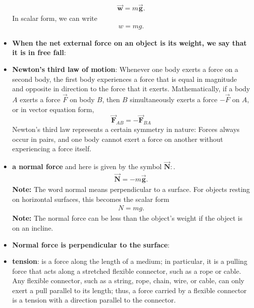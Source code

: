 \documentclass{report}
\begin{document}
\begin{itemize}
\begin{align*}
                    \vec{\mathbf{w}} = m\vec{\mathbf{g}}
                .\end{align*}
                In scalar form, we can write
                \begin{align*}
                    w = mg
                .\end{align*}
            \item \textbf{When the net external force on an object is its weight, we say that it is in free fall}:
            \item \textbf{Newton's third law of motion}:
                Whenever one body exerts a force on a second body, the first body experiences a force that is equal in magnitude and opposite in direction to the force that it exerts. Mathematically, if a body $A$ exerts a force $\vec{F}$ on body $B$, then $B$ simultaneously exerts a force $-\vec{F}$ on $A$, or in vector equation form,
                \[
                    \vec{\mathbf{F}}_{AB} = -\vec{\mathbf{F}}_{BA}
                \]
                \bigbreak \noindent 
                Newton’s third law represents a certain symmetry in nature: Forces always occur in pairs, and one body cannot exert a force on another without experiencing a force itself.
            \item \textbf{a normal force} and here is given by the symbol $\vec{\mathbf{N}}:$.
                \begin{align*}
                    \vec{\mathbf{N}} = -m\vec{\mathbf{g}}
                .\end{align*}
                \textbf{Note:} The word normal means perpendicular to a surface.
                \bigbreak \noindent 
                For objects resting on horizontal surfaces, this becomes the scalar form 
                \begin{align*}
                    N = mg
                .\end{align*}
                \bigbreak \noindent 
                \textbf{Note:} The normal force can be less than the object’s weight if the object is on an incline.
            \item \textbf{Normal force is perpendicular to the surface}:
            \item \textbf{tension}: is a force along the length of a medium; in particular, it is a pulling force that acts along a stretched flexible connector, such as a rope or cable.
                \smallbreak \noindent
                Any flexible connector, such as a string, rope, chain, wire, or cable, can only exert a pull parallel to its length; thus, a force carried by a flexible connector is a tension with a direction parallel to the connector.

\end{itemize}
\end{document}
